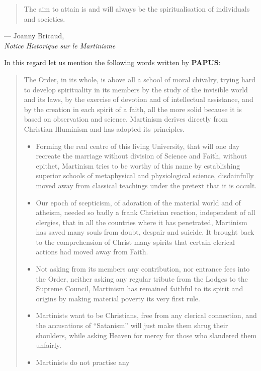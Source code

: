 \begin{quote}
    The aim to attain is and will always be the spiritualisation of individuals and societies.
\end{quote}
\begin{flushright}
    --- Joanny Bricaud,\\\textit{Notice Historique sur le Martinisme}
\end{flushright}

In this regard let us mention the following words written by \textbf{PAPUS}:

\begin{quote}
    The Order, in its whole, is above all a school of moral chivalry, trying hard
to develop spirituality in its members by the study of the invisible world and its
laws, by the exercise of devotion and of intellectual assistance, and by the creation
in each spirit of a faith, all the more solid because it is based on observation and
science. Martinism derives directly from Christian Illuminism and has adopted its
principles.
\begin{itemize}
    \item Forming the real centre of this living University, that will one day
recreate the marriage without division of Science and Faith, without epithet,
Martinism tries to be worthy of this name by establishing superior schools of
metaphysical and physiological science, disdainfully moved away from classical
teachings under the pretext that it is occult.
    \item Our epoch of scepticism, of
adoration of the material world and of atheism, needed so badly a frank Christian
reaction, independent of all clergies, that in all the countries where it has
penetrated, Martinism has saved many souls from doubt, despair and suicide. It
brought back to the comprehension of Christ many spirits that certain clerical
actions had moved away from Faith.
    \item Not asking from its members any
contribution, nor entrance fees into the Order, neither asking any regular tribute
from the Lodges to the Supreme Council, Martinism has remained faithful to its
spirit and origins by making material poverty its very first rule.
    \item Martinists want
to be Christians, free from any clerical connection, and the accusations of
``Satanism'' will just make them shrug their shoulders, while asking Heaven for
mercy for those who slandered them unfairly.
    \item Martinists do not practise any

\end{itemize}
\end{quote}
